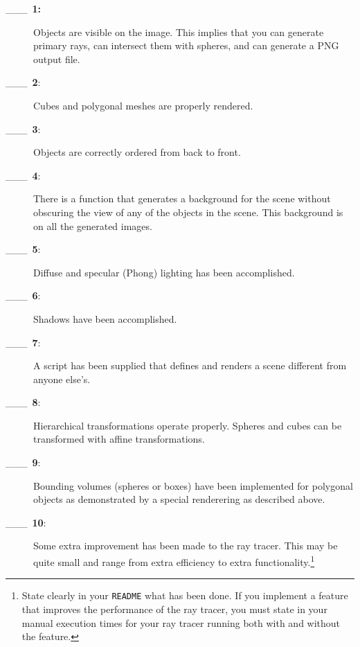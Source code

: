  \bigskip
\begin{description}
\item[\_\_\_\ {\bf 1:}]
	Objects are visible on the image.  This implies that you can
	generate primary rays, can intersect them with spheres,
	and can generate a PNG output file.
\item[\_\_\_\ {\bf 2}:]
	Cubes and polygonal meshes are properly rendered.
\item[\_\_\_\ {\bf 3}:]
	Objects are correctly ordered from back to front.
\item[\_\_\_\ {\bf 4}:]
	There is a function that generates a background for the
	scene without obscuring the view of any of the objects
	in the scene.  This background is on all the generated
        images.
\item[\_\_\_\ {\bf 5}:]
	Diffuse and specular (Phong) lighting has been accomplished.
\item[\_\_\_\ {\bf 6}:]
	Shadows have been accomplished.
\item[\_\_\_\ {\bf 7}:]
	A script has been supplied that defines and renders a scene 
	different from anyone else's.
\item[\_\_\_\ {\bf 8}:] 
	Hierarchical transformations operate properly.  Spheres and
	cubes can be transformed with affine transformations.
\item[\_\_\_\ {\bf 9}:]
	Bounding volumes (spheres or boxes) have been implemented for
	polygonal objects as demonstrated by a special renderering as
	described above.
\item[\_\_\_\ {\bf 10}:]
	Some extra improvement has been made to the ray tracer.  This may be
	quite small and range from extra efficiency to extra 
	functionality.\footnote{
		State clearly in your {\tt README} what has been done.
		If you implement a feature that improves the performance 
		of the ray tracer, you must state in your manual execution times for 
		your ray tracer running both with and without the feature.
	}
\end{description}




